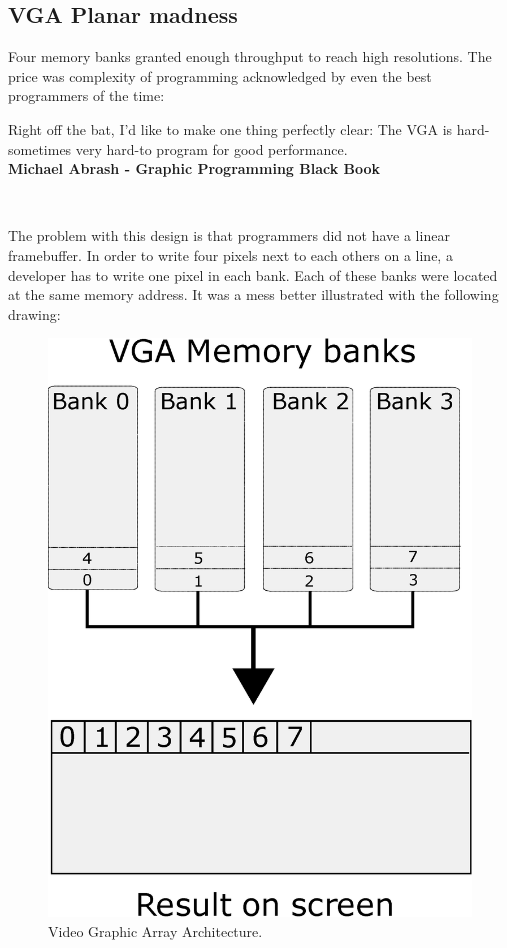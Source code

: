 \documentclass[book.tex]{subfiles}
\begin{document}
\subsection{VGA Planar madness}

Four memory banks granted enough throughput to reach high resolutions. The price was complexity of programming acknowledged by even the best programmers of the time:\\

 \begin{fancyquotes}
   Right off the bat, I'd like to make one thing perfectly clear: The VGA is hard-sometimes very hard-to program for good performance.
 \bigskip \\
\textbf{Michael Abrash - Graphic Programming Black Book}
 \end{fancyquotes}
 \\
\par
The problem with this design is that programmers did not have a linear framebuffer. In order to write four pixels next to each others on a line, a developer has to write one pixel in each bank. Each of these banks were located at the same memory address. It was a mess better illustrated with the following drawing:\\
\par
\begin{figure}[H]
\centering
\includegraphics[width=\textwidth]{imgs/drawings/vga_ram_screen_layout.eps}
\caption{Video Graphic Array Architecture.}
\label{fig:vga_arch}
\end{figure}
\end{document}
